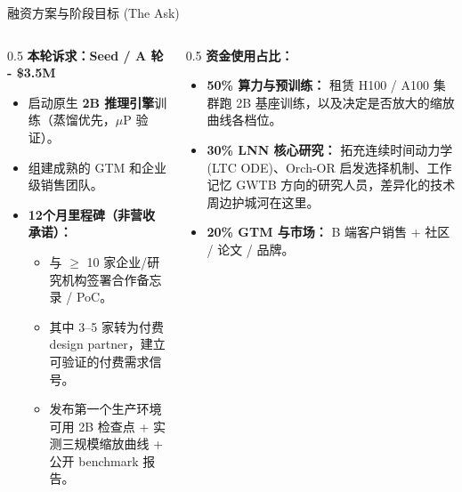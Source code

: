 \documentclass[aspectratio=169, 10pt]{beamer}
\begin{document}
\begin{frame}{融资方案与阶段目标 (The Ask)}
\begin{columns}
\begin{column}{0.5\textwidth}
\textbf{本轮诉求：Seed / A 轮 - \$3.5M}
\vspace{0.5em}
\begin{itemize}
    \item 启动原生 \textbf{2B 推理引擎}训练（蒸馏优先，$\mu$P 验证）。
    \item 组建成熟的 GTM 和企业级销售团队。
    \item \textbf{12个月里程碑（非营收承诺）：}
    \begin{itemize}\footnotesize
        \item 与 $\geq$ 10 家企业/研究机构签署合作备忘录 / PoC。
        \item 其中 3--5 家转为付费 design partner，建立可验证的付费需求信号。
        \item 发布第一个生产环境可用 2B 检查点 + 实测三规模缩放曲线 + 公开 benchmark 报告。
    \end{itemize}
\end{itemize}
\end{column}
\begin{column}{0.5\textwidth}
\textbf{资金使用占比：}
\begin{itemize}
    \item \textbf{50\% 算力与预训练：} 租赁 H100 / A100 集群跑 2B 基座训练，以及决定是否放大的缩放曲线各档位。
    \item \textbf{30\% LNN 核心研究：} 拓充连续时间动力学 (LTC ODE)、Orch-OR 启发选择机制、工作记忆 GWTB 方向的研究人员，差异化的技术周边护城河在这里。
    \item \textbf{20\% GTM 与市场：} B 端客户销售 + 社区 / 论文 / 品牌。
\end{itemize}
\end{column}
\end{columns}
\end{frame}
\end{document}

